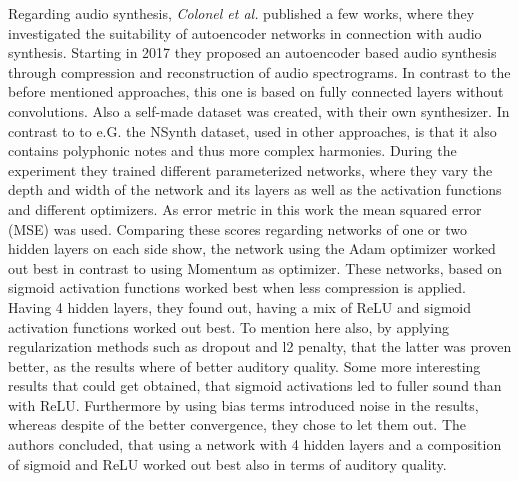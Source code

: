 Regarding audio synthesis, \textit{Colonel et al.} published a few works, where they investigated the suitability of autoencoder networks in connection with audio synthesis. \cite{colonel2017improving, colonel2018autoencoding, Colonel2020} Starting in 2017 they proposed an autoencoder based audio synthesis through compression and reconstruction of audio spectrograms. \cite{colonel2017improving} In contrast to the before mentioned approaches, this one is based on fully connected layers without convolutions. Also a self-made dataset was created, with their own synthesizer. In contrast to to e.G. the NSynth dataset, used in other approaches, is that it also contains polyphonic notes and thus more complex harmonies. During the experiment they trained different parameterized networks, where they vary the depth and width of the network and its layers as well as the activation functions and different optimizers. As error metric in this work the mean squared error (MSE) was used. Comparing these scores regarding networks of one or two hidden layers on each side show, the network using the Adam optimizer worked out best in contrast to using Momentum as optimizer. These networks, based on sigmoid activation functions worked best when less compression is applied. Having 4 hidden layers, they found out, having a mix of ReLU and sigmoid activation functions worked out best. To mention here also, by applying regularization methods such as dropout and l2 penalty, that the latter was proven better, as the results where of better auditory quality. Some more interesting results that could get obtained, that sigmoid activations led to fuller sound than with ReLU. Furthermore by using bias terms introduced noise in the results, whereas despite of the better convergence, they chose to let them out. The authors concluded, that using a network with 4 hidden layers and a composition of sigmoid and ReLU worked out best also in terms of auditory quality.\\


